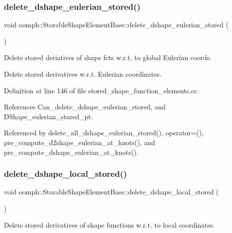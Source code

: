\subsubsection{\texorpdfstring{delete\+\_\+dshape\+\_\+eulerian\+\_\+stored()}{delete\_dshape\_eulerian\_stored()}}
{\footnotesize\ttfamily void oomph\+::\+Storable\+Shape\+Element\+Base\+::delete\+\_\+dshape\+\_\+eulerian\+\_\+stored (\begin{DoxyParamCaption}{ }\end{DoxyParamCaption})}



Delete stored deriatives of shape fcts w.\+r.\+t. to global Eulerian coords. 

Delete stored derivatives w.\+r.\+t. Eulerian coordinates. 

Definition at line 146 of file stored\+\_\+shape\+\_\+function\+\_\+elements.\+cc.



References Can\+\_\+delete\+\_\+dshape\+\_\+eulerian\+\_\+stored, and D\+Shape\+\_\+eulerian\+\_\+stored\+\_\+pt.



Referenced by delete\+\_\+all\+\_\+dshape\+\_\+eulerian\+\_\+stored(), operator=(), pre\+\_\+compute\+\_\+d2shape\+\_\+eulerian\+\_\+at\+\_\+knots(), and pre\+\_\+compute\+\_\+dshape\+\_\+eulerian\+\_\+at\+\_\+knots().

\mbox{\label{classoomph_1_1StorableShapeElementBase_a4722c398edbf54a39e9eb30758b897e9}} 
\subsubsection{\texorpdfstring{delete\+\_\+dshape\+\_\+local\+\_\+stored()}{delete\_dshape\_local\_stored()}}
{\footnotesize\ttfamily void oomph\+::\+Storable\+Shape\+Element\+Base\+::delete\+\_\+dshape\+\_\+local\+\_\+stored (\begin{DoxyParamCaption}{ }\end{DoxyParamCaption})}



Delete stored derivatives of shape functions w.\+r.\+t. to local coordinates. 

